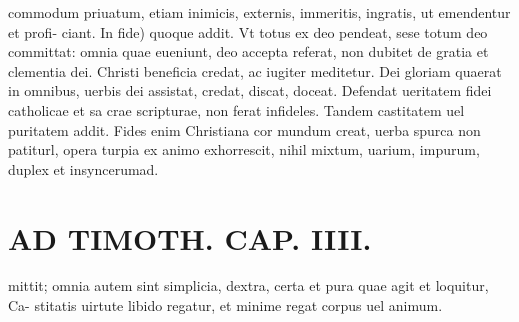 \documentclass{article}
\begin{document}
\begin{pages}
commodum priuatum, etiam inimicis, externis, immeritis, ingratis, ut emendentur et profi- ciant. In fide) quoque addit. Vt totus ex deo pendeat, sese totum deo committat: omnia quae eueniunt, deo accepta referat, non dubitet de gratia et clementia dei. Christi beneficia credat, ac iugiter meditetur. Dei gloriam quaerat in omnibus, uerbis dei assistat, credat, discat, doceat. Defendat ueritatem fidei catholicae et sa crae scripturae, non ferat infideles. Tandem castitatem uel puritatem addit. Fides enim Christiana cor mundum creat, uerba spurca non patiturl, opera turpia ex animo exhorrescit, nihil mixtum, uarium, impurum, duplex et insyncerumad.  \pend
{}
{}
\subsection*{\textit{}}
\section*{AD TIMOTH. CAP. IIII. }
\marginpar{[ p.511 ]}\pstart mittit; omnia autem sint simplicia, dextra, certa et pura quae agit et loquitur, Ca- stitatis uirtute libido regatur, et minime regat corpus uel animum.  \pend
{}
{}

\end{pages}
\end{document}
